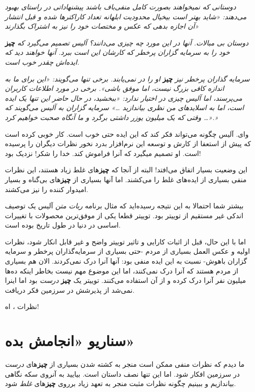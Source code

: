 \emph{دوستانی که نمیخواهند بصورت کامل منفی‌باف باشند پیشنهاداتی در
راستای بهبود می‌دهند: «شاید بهتر است بیخیال محدودیت ابلهانه تعداد
کاراکترها شده و قبل انتشار آن اجازه بدهی که عکس و مختصات خود را نیز به
اشتراک بگذارند»}

\emph{دوستان بی مبالات. آنها در این مورد چه چیزی می‌دانند؟ آلیس تصمیم
می‌گیرد که} \textbf{چیز} \emph{خود را به سرمایه گزاران پرخطر که کارشان
این است ببرد. آنها خواهند دید که ایده‌اش چقدر خوب است.}

\emph{سرمایه گذاران پرخطر نیز} \textbf{چیز} \emph{او را در نمی‌یابند.
برخی تنها می‌گویند: «این برای ما به اندازه کافی بزرگ نیست، اما موفق
باشی». برخی در مورد اطلاعات کاربران می‌پرسند، اما آلیس چیزی در اختیار
ندارد: «ببخشید، در حال حاضر این تنها یک ایده‌ است، اما به اسلایدهای من
نظری بیاندازید \ldots{}» سرمایه گزاران به آلیس می‌گویند که «\ldots{}
وقتی که یک میلیون یوزر داشتی برگرد و ما آنگاه صحبت خواهیم کرد.»}

وای. آلیس چگونه می‌تواند فکر کند که این ایده حتی خوب است. کار خوبی کرده
است که پیش از استعفا از کارش و توسعه این نرم‌افزار بدرد نخور نظرات
دیگران را پرسیده است. او تصمیم میگیرد که آنرا فراموش کند. خدا را شکر!
نزدیک بود!

این وضعیت بسیار اتفاق می‌افتد! البته از آنجا که \textbf{چیز}های غلط زیاد
هستند، این نظرات منفی بسیاری از ایده‌های غلط را می‌کشند. اما آنها بسیاری
از \textbf{چیز}های بی‌گناه و بسیار امیدوار کننده را نیز می‌کشند.

بیشتر شما احتمالا به این نتیجه رسیده‌اید که مثال برنامه \emph{ربات متن}
آلیس یک توصیف اندکی غیر مستقیم از توییتر بود. توییتر قطعا یکی از
موفق‌ترین محصولات با تغییرات اساسی در دنیا در طول تاریخ بوده است.

اما با این حال، قبل از اثبات کارایی و تاثیر توییتر واضح و غیر قابل انکار
شود، نظرات اولیه و عکس العمل بسیاری از مردم -حتی بسیاری از سرمایه‌گذاران
پرخطر و سرمایه گزاران باهوش- نسبت به این ایده منفی بود: آنها آنرا درک
نمی‌کردند. الان هم بسیاری از مردم هستند که آنرا درک نمی‌کنند، اما این
موضوع مهم نیست بخاطر اینکه ده‌ها میلیون نفر آنرا درک کرده و از آن
استفاده می‌کنند. توییتر یک \textbf{چیز} \emph{درست} بود اما اینرا نمی‌شد
از پذیرشش در سرزمین فکر دریافت.

نظرات ، اه!

\section{سناریو «انجامش
بده»}\label{ux633ux646ux627ux631ux6ccux648-ux627ux646ux62cux627ux645ux634-ux628ux62fux647}

ما دیدم که نظرات منفی ممکن است منجر به کشته شدن بسیاری از
\textbf{چیز}های \emph{درست} در سرزمین افکار شود. اما این تنها نصف داستان
است. بیایید به آنروی سکه نگاهی بیاندازیم و ببینیم چگونه نظرات مثبت منجر
به تعهد زیاد برروی \textbf{چیز}های \emph{غلط} شود.

